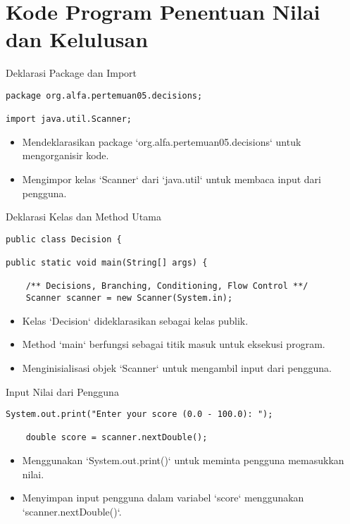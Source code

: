 \documentclass[aspectratio=169, table]{beamer}
\begin{document}
\section{Kode Program Penentuan Nilai dan Kelulusan}

\begin{frame}[fragile]{Deklarasi Package dan Import}
\begin{lstlisting}[style=JavaStyle]
package org.alfa.pertemuan05.decisions;

import java.util.Scanner;
\end{lstlisting}
\begin{itemize}
\item Mendeklarasikan package `org.alfa.pertemuan05.decisions` untuk mengorganisir kode.
\item Mengimpor kelas `Scanner` dari `java.util` untuk membaca input dari pengguna.
\end{itemize}
\end{frame}

\begin{frame}[fragile]{Deklarasi Kelas dan Method Utama}
\begin{lstlisting}[style=JavaStyle]
public class Decision {

public static void main(String[] args) {
	
	/** Decisions, Branching, Conditioning, Flow Control **/
	Scanner scanner = new Scanner(System.in);
\end{lstlisting}
\begin{itemize}
	\item Kelas `Decision` dideklarasikan sebagai kelas publik.
	\item Method `main` berfungsi sebagai titik masuk untuk eksekusi program.
	\item Menginisialisasi objek `Scanner` untuk mengambil input dari pengguna.
\end{itemize}
\end{frame}

\begin{frame}[fragile]{Input Nilai dari Pengguna}
\begin{lstlisting}[style=JavaStyle]
	System.out.print("Enter your score (0.0 - 100.0): ");
	
	double score = scanner.nextDouble();
\end{lstlisting}
\begin{itemize}
	\item Menggunakan `System.out.print()` untuk meminta pengguna memasukkan nilai.
	\item Menyimpan input pengguna dalam variabel `score` menggunakan `scanner.nextDouble()`.
\end{itemize}
\end{frame}
\end{document}
